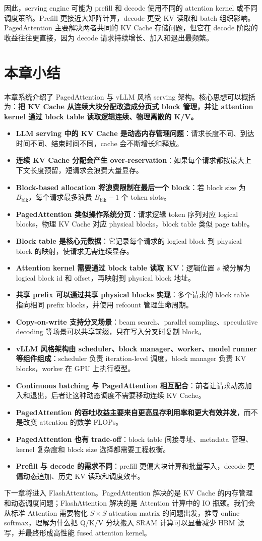 因此，serving engine 可能为 prefill 和 decode 使用不同的 attention kernel 或不同调度策略。Prefill 更接近大矩阵计算，decode 更受 KV 读取和 batch 组织影响。PagedAttention 主要解决两者共同的 KV Cache 存储问题，但它在 decode 阶段的收益往往更直接，因为 decode 请求持续增长、加入和退出最频繁。

\section{本章小结}
\label{sec:chapter13-summary}

本章系统介绍了 PagedAttention 与 vLLM 风格 serving 架构。核心思想可以概括为：\textbf{把 KV Cache 从连续大块分配改造成分页式 block 管理，并让 attention kernel 通过 block table 读取逻辑连续、物理离散的 K/V。}

\begin{itemize}
\item \textbf{LLM serving 中的 KV Cache 是动态内存管理问题}：请求长度不同、到达时间不同、结束时间不同，cache 会不断增长和释放。
\item \textbf{连续 KV Cache 分配会产生 over-reservation}：如果每个请求都按最大上下文长度预留，短请求会浪费大量显存。
\item \textbf{Block-based allocation 将浪费限制在最后一个 block}：若 block size 为 $B_{\mathrm{blk}}$，每个请求最多浪费 $B_{\mathrm{blk}}-1$ 个 token slots。
\item \textbf{PagedAttention 类似操作系统分页}：请求逻辑 token 序列对应 logical blocks，物理 KV Cache 对应 physical blocks，block table 类似 page table。
\item \textbf{Block table 是核心元数据}：它记录每个请求的 logical block 到 physical block 的映射，使请求无需连续显存。
\item \textbf{Attention kernel 需要通过 block table 读取 KV}：逻辑位置 $s$ 被分解为 logical block id 和 offset，再映射到 physical block 地址。
\item \textbf{共享 prefix 可以通过共享 physical blocks 实现}：多个请求的 block table 指向相同 prefix blocks，并使用 refcount 管理生命周期。
\item \textbf{Copy-on-write 支持分叉场景}：beam search、parallel sampling、speculative decoding 等场景可以共享前缀，只在写入分叉时复制 block。
\item \textbf{vLLM 风格架构由 scheduler、block manager、worker、model runner 等组件组成}：scheduler 负责 iteration-level 调度，block manager 负责 KV blocks，worker 在 GPU 上执行模型。
\item \textbf{Continuous batching 与 PagedAttention 相互配合}：前者让请求动态加入和退出，后者让这种动态调度不需要移动连续 KV Cache。
\item \textbf{PagedAttention 的吞吐收益主要来自更高显存利用率和更大有效并发}，而不是改变 attention 的数学 FLOPs。
\item \textbf{PagedAttention 也有 trade-off}：block table 间接寻址、metadata 管理、kernel 复杂度和 block size 选择都需要工程权衡。
\item \textbf{Prefill 与 decode 的需求不同}：prefill 更偏大块计算和批量写入，decode 更偏动态追加、历史 KV 读取和调度效率。
\end{itemize}

下一章将进入 FlashAttention。PagedAttention 解决的是 KV Cache 的内存管理和动态调度问题；FlashAttention 解决的是 Attention 计算中的 IO 瓶颈。我们会从标准 Attention 需要物化 $S\times S$ attention matrix 的问题出发，推导 online softmax，理解为什么把 Q/K/V 分块搬入 SRAM 计算可以显著减少 HBM 读写，并最终形成高性能 fused attention kernel。
